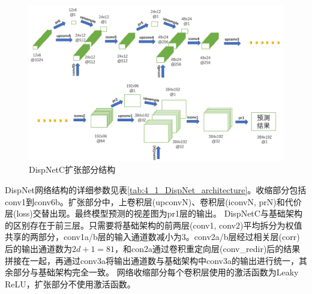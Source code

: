 \begin{figure}[!htb]
	\centering\includegraphics[width=6in]{figures/4_1_dispnet_expanding_part.png}
	\caption{DispNetC扩张部分结构}\label{fig:4_1_DispNet_expanding_part}
\end{figure}

DispNet网络结构的详细参数见表\ref{tab:4_1_DispNet_architecture}。收缩部分包括conv1到conv6b。扩张部分中，上卷积层(upconvN)、卷积层(iconvN,  prN)和代价层(loss)交替出现。最终模型预测的视差图为pr1层的输出。
DispNetC与基础架构的区别存在于前三层。只需要将基础架构的前两层(conv1, conv2)平均拆分为权值共享的两部分，conv1a/b层的输入通道数减小为3。conv2a/b层经过相关层(corr)后的输出通道数为$2d+1=81$，和con2a通过卷积重定向层(conv\_redir)后的结果拼接在一起，再通过conv3a将输出通道数与基础架构中conv3a的输出进行统一，其余部分与基础架构完全一致。
网络收缩部分每个卷积层使用的激活函数为Leaky ReLU，扩张部分不使用激活函数。

